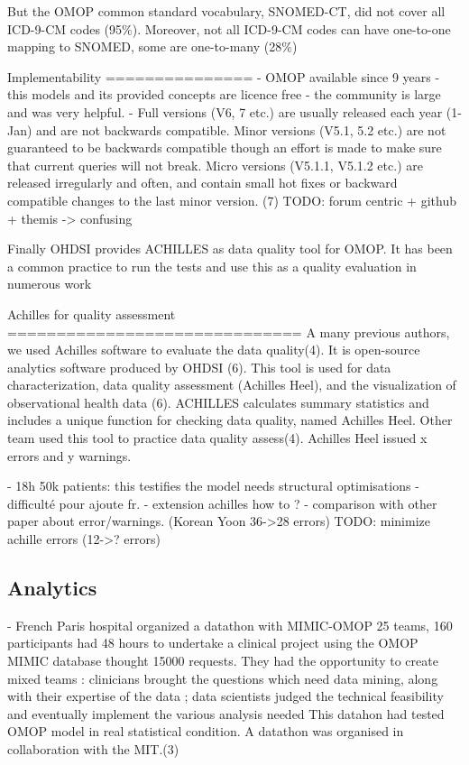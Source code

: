 But the OMOP common standard vocabulary, SNOMED-CT, did not cover all ICD-9-CM
codes (95\%). Moreover, not all ICD-9-CM codes can have one-to-one mapping to
SNOMED, some are one-to-many (28\%)\cite{snomed-icd9}
 
Implementability
===============
- OMOP available since 9 years
- this models and its provided concepts are licence free
- the community is large and was very helpful.
- Full versions (V6, 7 etc.) are usually released each year (1-Jan) and are not backwards compatible. 
Minor versions (V5.1, 5.2 etc.) are not guaranteed to be backwards compatible though an effort is made to make sure that current queries will not break. 
Micro versions (V5.1.1, V5.1.2 etc.) are released irregularly and often, and contain small hot fixes or backward compatible changes to the last minor version.
(7)
TODO: forum centric + github + themis -> confusing


Finally OHDSI provides ACHILLES as data quality tool for OMOP. It has been a
common practice to run the tests and use this as a quality evaluation in
numerous work \cite{achilles-papers}

Achilles for quality assessment
==============================
A many previous authors, we used Achilles software to evaluate the data
quality(4). It is open-source analytics software produced by OHDSI (6).  This
tool is used for data characterization, data quality assessment (Achilles
Heel), and the visualization of observational health data (6).  ACHILLES
calculates summary statistics and includes a unique function for checking data
quality, named Achilles Heel. 
Other team used this tool to practice data quality assess(4).
Achilles Heel issued x errors and y warnings.

- 18h 50k patients: this testifies the model needs structural optimisations
- difficulté pour ajoute fr. 
- extension achilles how to ?
- comparison with other paper about error/warnings. (Korean Yoon 36->28 errors)
TODO: minimize achille errors  (12->? errors)


\subsection{Analytics}

- French Paris hospital organized a datathon with MIMIC-OMOP
25 teams, 160 participants had 48 hours to undertake a clinical project using the OMOP MIMIC database thought 15000 requests. They had the opportunity to create mixed teams : clinicians brought the questions which need data mining, along with their expertise of the data ; data scientists judged the technical feasibility and eventually implement the various analysis needed
This datahon had tested OMOP model in real statistical condition. A datathon was organised in collaboration with the MIT.(3)

